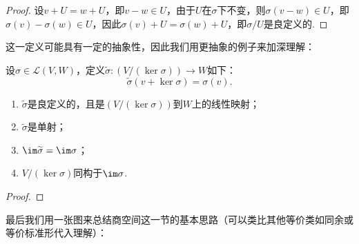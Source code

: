 \begin{proof}
    设$v+U=w+U$，即$v-w\in U$，由于$U$在$\sigma$下不变，则$\sigma(v-w)\in U$，即$\sigma(v)-\sigma(w)\in U$，因此$\sigma(v)+U=\sigma(w)+U$，即$\sigma/U$是良定义的.
\end{proof}

这一定义可能具有一定的抽象性，因此我们用更抽象的例子来加深理解：
\begin{example}
    设$\sigma\in \mathcal{L}(V,W)$，定义$\widetilde{\sigma}:(V/(\ker \sigma))\to W$如下：
    \[\widetilde{\sigma}(v+\ker\sigma)=\sigma(v).\]
    \begin{enumerate}
        \item $\widetilde{\sigma}$是良定义的，且是$(V/(\ker \sigma))$到$W$上的线性映射；

        \item $\widetilde{\sigma}$是单射；

        \item $\im \widetilde{\sigma}=\im \sigma$；

        \item $V/(\ker \sigma)$同构于$\im \sigma$.
    \end{enumerate}
\end{example}

\begin{proof}

\end{proof}

最后我们用一张图来总结商空间这一节的基本思路（可以类比其他等价类如同余或等价标准形代入理解）：

